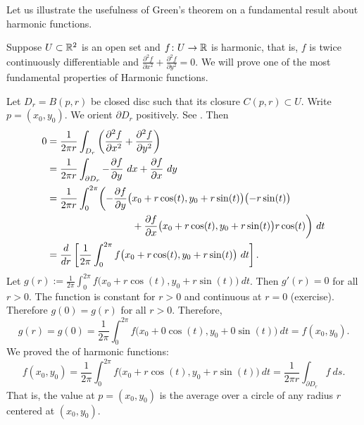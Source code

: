 Let us illustrate the usefulness of Green's theorem on a fundamental result
about harmonic functions.

\begin{example}
Suppose $U \subset {\mathbb{R}}^2$ is an open set and
$f \colon U \to {\mathbb{R}}$ is harmonic, that is, $f$ is twice continuously
differentiable and
$\frac{\partial^2 f}{\partial x^2} +
\frac{\partial^2 f}{\partial y^2} = 0$.
We will prove one of the most fundamental properties of Harmonic functions.

Let $D_r = B(p,r)$ be closed disc such that its closure $C(p,r) \subset U$.  Write
$p = (x_0,y_0)$.  We orient
$\partial D_r$ positively.  See .
Then
\begin{equation*}
\begin{split}
0
& =
\frac{1}{2\pi r}
\int_{D_r}
\left(
\frac{\partial^2 f}{\partial x^2} +
\frac{\partial^2 f}{\partial y^2}
\right)
\\
& 
=
\frac{1}{2\pi r}
\int_{\partial D_r}
- \frac{\partial f}{\partial y} ~ dx + 
\frac{\partial f}{\partial x} ~ dy
\\
&
=
\frac{1}{2\pi r}
\int_0^{2\pi}
\biggl(
- \frac{\partial f}{\partial y} \bigl(x_0+r\cos(t),y_0+r\sin(t)\bigr) \bigl(-r\sin(t)\bigr)
\\
& \hspace{1.2in}
+ \frac{\partial f}{\partial x} \bigl(x_0+r\cos(t),y_0+r\sin(t)\bigr) r\cos(t)
\biggr) ~ dt
\\
&
=
\frac{d}{dr}
\left[
\frac{1}{2\pi}
\int_0^{2\pi}
f\bigl(x_0+r\cos(t),y_0+r\sin(t)\bigr) ~ dt
\right] .
\end{split}
\end{equation*}
Let $g(r) := 
\frac{1}{2\pi}
\int_0^{2\pi}
f\bigl(x_0+r\cos(t),y_0+r\sin(t)\bigr) ~ dt$.  Then $g'(r) = 0$ for all
$r > 0$.
The function is constant for $r >0$ and continuous at $r=0$ (exercise).
Therefore $g(0) = g(r)$ for all $r > 0$.  Therefore,
\begin{equation*}
g(r) = g(0) = 
\frac{1}{2\pi}
\int_0^{2\pi}
f\bigl(x_0+0\cos(t),y_0+0\sin(t)\bigr) ~ dt
=
f(x_0,y_0).
\end{equation*}
We
proved the \emph{} of harmonic functions:
\begin{equation*}
f(x_0,y_0) = 
\frac{1}{2\pi}
\int_0^{2\pi}
f\bigl(x_0+r\cos(t),y_0+r\sin(t)\bigr) ~ dt 
=
\frac{1}{2\pi r}
\int_{\partial D_r} f ~ ds .
\end{equation*}
That is, the value at $p = (x_0,y_0)$ is the average over a circle of any
radius $r$ centered at $(x_0,y_0)$.
\end{example}

